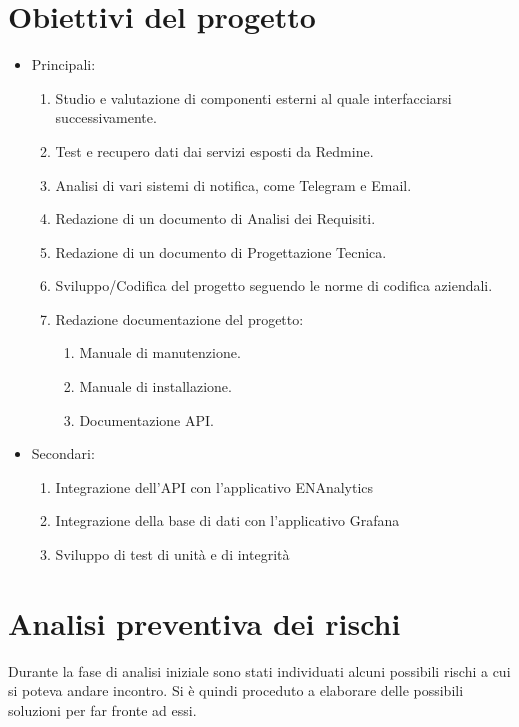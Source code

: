 \section{Obiettivi del progetto}
\begin{itemize}
	\item Principali:
	\begin{enumerate}
		\item Studio e valutazione di componenti esterni al quale interfacciarsi successivamente.
		\item Test e recupero dati dai servizi esposti da Redmine.
		\item Analisi di vari sistemi di notifica, come Telegram e Email.
		\item Redazione di un documento di Analisi dei Requisiti.
		\item Redazione di un documento di Progettazione Tecnica.
		\item Sviluppo/Codifica del progetto seguendo le norme di codifica aziendali.
		\item Redazione documentazione del progetto:
		\begin{enumerate}
			\item Manuale di manutenzione.
			\item Manuale di installazione.
			\item Documentazione API.
		\end{enumerate}
	\end{enumerate}
	\item Secondari:
	\begin{enumerate}
		\item Integrazione dell'API con l'applicativo ENAnalytics
		\item Integrazione della base di dati con l'applicativo Grafana
		\item Sviluppo di test di unità e di integrità
	\end{enumerate}
\end{itemize}


\section{Analisi preventiva dei rischi}

Durante la fase di analisi iniziale sono stati individuati alcuni possibili rischi a cui si poteva andare incontro.
Si è quindi proceduto a elaborare delle possibili soluzioni per far fronte ad essi.\\


